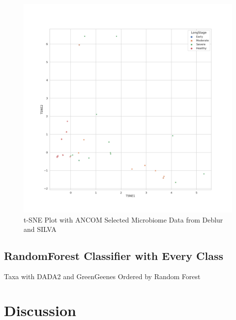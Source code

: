 \documentclass[a4paper]{article}
\begin{document}
            \begin{figure}[p]
                \centering
                \includegraphics[width=0.6 \linewidth]{figures/tSNE/ANCOM/ANCOM.Deblur.silva.png}
                \caption{t-SNE Plot with ANCOM Selected Microbiome Data from Deblur and SILVA}
                \label{fig:tsne-ANCOM-deblur-silva}
            \end{figure}

        \subsection{RandomForest Classifier with Every Class}

            \begin{table}[p]
                \centering
                \caption{Taxa with DADA2 and GreenGeenes Ordered by Random Forest}
                \label{tb:RF-whole-dada2-gg}

            \end{table}

    \section{Discussion}

    
    
\end{document}
